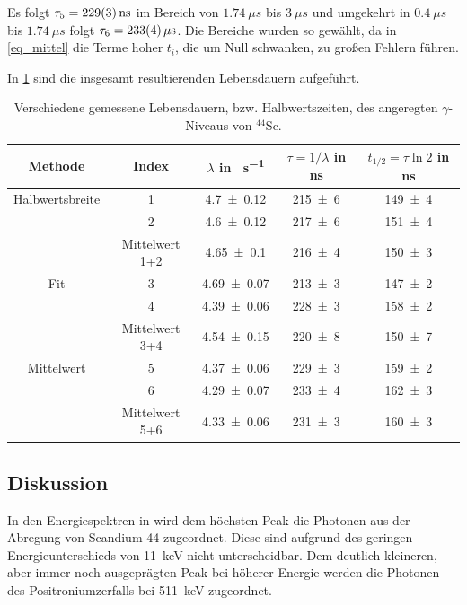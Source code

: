\documentclass[
	a4paper,
	12pt,
	pagesize,
	ngerman
]{scrartcl}
\begin{document}
		Es folgt $\tau_5=\SI{229+-3}{ns}$ im Bereich von $\SI{1.74}{\mu s}$ bis $\SI{3}{\mu s}$ und umgekehrt in $\SI{0.4}{\mu s}$ bis $\SI{1.74}{\mu s}$ folgt $\tau_6=\SI{233+-4}{\mu s}$.
		Die Bereiche wurden so gewählt, da in \cref{eq_mittel} die Terme hoher $t_i$, die um Null schwanken, zu großen Fehlern führen.

		In \cref{tb_leb} sind die insgesamt resultierenden Lebensdauern aufgeführt.
		\begin{table}[H]
		\centering
		\begin{tabular}{c| c | c | c | c  }
			 Methode&Index&$\lambda$ in \si{\mu s^{-1}}& $\tau=1/\lambda$ in \si{ns} &$t_{1/2}=\tau\ln 2$ in \si{ns}\\ \hline
			 Halbwertsbreite&1&\SI{4.7+-0.12}{}&\SI{215+-6}{}&\SI{149+-4}{}\\
			 &2&\SI{4.6+-0.12}{}&\SI{217+-6}{}&\SI{151+-4}{}\\
			 &Mittelwert 1+2&\SI{4.65+-0.1}{}&\SI{216+-4}{}&\SI{150+-3}{}\\\hline
			 Fit&3&\SI{4.69+-0.07}{}&\SI{213+-3}{}&\SI{147+-2}{} \\
			 &4&\SI{4.39+-0.06}{}&\SI{228+-3}{}&\SI{158+-2}{} \\
			 &Mittelwert 3+4&\SI{4.54+-0.15}{}&\SI{220+-8}{}&\SI{150+-7}{}\\\hline
			 Mittelwert&5&\SI{4.37+-0.06}{}&\SI{229+-3}{}&\SI{159+-2}{}\\
			 &6&\SI{4.29+-0.07}{}&\SI{233+-4}{}&\SI{162+-3}{}\\
			 &Mittelwert 5+6&\SI{4.33+-0.06}{}&\SI{231+-3}{}&\SI{160+-3}{}\\\hline
		\end{tabular}
		\caption{
		Verschiedene gemessene Lebensdauern, bzw. Halbwertszeiten, des angeregten $\gamma$-Niveaus von $^{44}$Sc.
		}
			 \label{tb_leb}
	\end{table}
	\subsection{Diskussion}
	In den Energiespektren in  wird dem höchsten Peak die Photonen aus der Abregung von Scandium-44 zugeordnet.
	Diese sind aufgrund des geringen Energieunterschieds von \SI{11}{keV} nicht unterscheidbar.
	Dem deutlich kleineren, aber immer noch ausgeprägten Peak bei höherer Energie werden die Photonen des Positroniumzerfalls bei \SI{511}{keV} zugeordnet.
\end{document}
